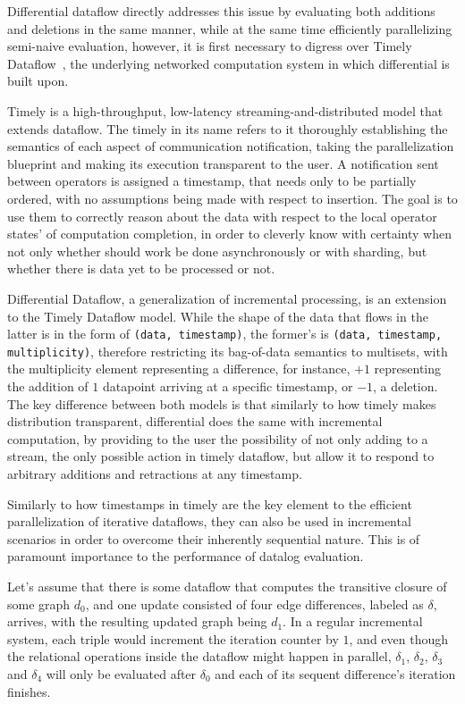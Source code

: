\documentclass[manuscript,screen,review]{acmart}
\theoremstyle{definition}
\begin{document}
Differential dataflow directly addresses this issue by evaluating both additions and deletions in the same manner, while at the same time efficiently parallelizing
semi-naive evaluation, however, it is first necessary to digress over Timely Dataflow~\cite{timely}, the underlying networked computation system in which differential
is built upon.

Timely is a high-throughput, low-latency streaming-and-distributed model that extends dataflow. The timely in its name refers to it thoroughly establishing
the semantics of each aspect of communication notification, taking the parallelization blueprint and making its execution transparent to the user. A notification
sent between operators is assigned a timestamp, that needs only to be partially ordered, with no assumptions being made with respect to insertion. The goal is to use
them to correctly reason about the data with respect to the local operator states' of computation completion, in order to cleverly know with certainty when not only
whether should work be done asynchronously or with sharding, but whether there is data yet to be processed or not.

Differential Dataflow, a generalization of incremental processing, is an extension to the Timely Dataflow model. While the shape of the data that flows in the latter is
in the form of \verb|(data, timestamp)|, the former's is \verb|(data, timestamp, multiplicity)|, therefore restricting its bag-of-data semantics to multisets, with
the multiplicity element representing a difference, for instance, $+1$ representing the addition of $1$ datapoint arriving at a specific timestamp, or $-1$, a deletion. The
key difference between both models is that similarly to how timely makes distribution transparent, differential does the same with incremental computation, by providing to the
user the possibility of not only adding to a stream, the only possible action in timely dataflow, but allow it to respond to arbitrary additions and retractions at any timestamp.

Similarly to how timestamps in timely are the key element to the efficient parallelization of iterative dataflows, they can also be used in incremental scenarios in order to
overcome their inherently sequential nature. This is of paramount importance to the performance of datalog evaluation.

Let's assume that there is some dataflow that computes the transitive closure of some graph $d_0$, and one update consisted of four edge differences, labeled as $\delta$, arrives, with
the resulting updated graph being $d_1$. In a regular incremental system, each triple would increment the iteration counter by $1$, and even though the relational operations inside
the dataflow might happen in parallel, $\delta_1$, $\delta_2$, $\delta_3$ and $\delta_4$ will only be evaluated after $\delta_0$ and each of its sequent difference's iteration finishes.
\end{document}
